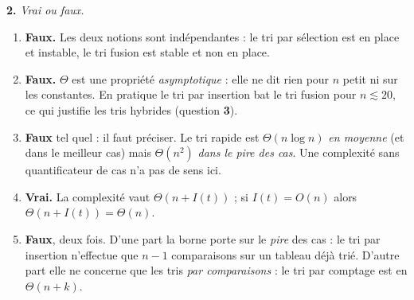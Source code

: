 \documentclass[11pt,a4paper]{article}
\begin{document}
\textbf{2.} \emph{Vrai ou faux.}
\begin{enumerate}[label=(\alph*),leftmargin=*,itemsep=3pt]
  \item \textbf{Faux.} Les deux notions sont indépendantes : le tri par sélection est en
        place et instable, le tri fusion est stable et non en place.
  \item \textbf{Faux.} $\Theta$ est une propriété \emph{asymptotique} : elle ne dit rien
        pour $n$ petit ni sur les constantes. En pratique le tri par insertion bat le tri
        fusion pour $n\lesssim20$, ce qui justifie les tris hybrides (question \textbf{3}).
  \item \textbf{Faux} tel quel : il faut préciser. Le tri rapide est $\Theta(n\log n)$
        \emph{en moyenne} (et dans le meilleur cas) mais $\Theta(n^2)$ \emph{dans le pire
        des cas}. Une complexité sans quantificateur de cas n'a pas de sens ici.
  \item \textbf{Vrai.} La complexité vaut $\Theta(n+I(t))$ ; si $I(t)=O(n)$ alors
        $\Theta(n+I(t))=\Theta(n)$.
  \item \textbf{Faux}, deux fois. D'une part la borne porte sur le \emph{pire} des cas :
        le tri par insertion n'effectue que $n-1$ comparaisons sur un tableau déjà trié.
        D'autre part elle ne concerne que les tris \emph{par comparaisons} : le tri par
        comptage est en $\Theta(n+k)$.
\end{enumerate}
\end{document}
